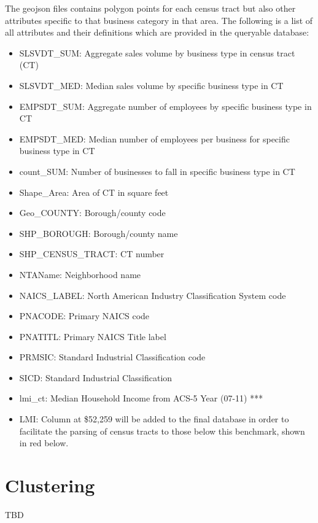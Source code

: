 \documentclass[article, 11pt]{article} %
\begin{document}
The geojson files contains polygon points for each census tract but also other attributes specific to that business category in that area. The following is a list of all attributes and their definitions which are provided in the queryable database:

\begin{itemize} 
\item SLSVDT\_SUM: Aggregate sales volume by business type in census tract (CT)
\item SLSVDT\_MED: Median sales volume by specific business type in CT
\item EMPSDT\_SUM: Aggregate number of employees by specific business type in
CT
\item EMPSDT\_MED: Median number of employees per business for specific business
type in CT
\item count\_SUM: Number of businesses to fall in specific business type in CT
\item Shape\_Area: Area of CT in square feet
\item Geo\_COUNTY: Borough/county code
\item SHP\_BOROUGH: Borough/county name
\item SHP\_CENSUS\_TRACT: CT number
\item NTAName: Neighborhood name
\item NAICS\_LABEL: North American Industry Classification System code
\item PNACODE: Primary NAICS code
\item PNATITL: Primary NAICS Title label
\item PRMSIC: Standard Industrial Classification code
\item SICD: Standard Industrial Classification
\item lmi\_ct: Median Household Income from ACS-5 Year (07-11) ***
\item LMI: Column at \$52,259 will be added to the final database in order to facilitate
the parsing of census tracts to those below this benchmark, shown in red below.
\end{itemize}



\section*{Clustering}

TBD


\end{document}
